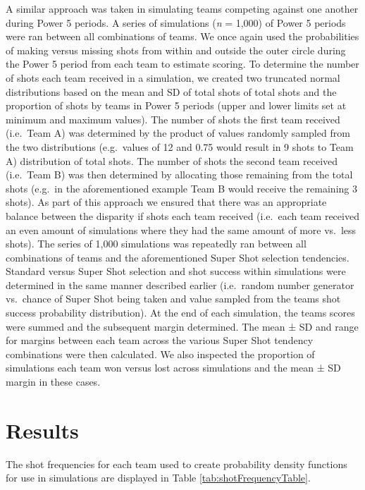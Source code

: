 \documentclass[]{elsarticle} %
\begin{document}
A similar approach was taken in simulating teams competing against one
another during Power 5 periods. A series of simulations (\emph{n} =
1,000) of Power 5 periods were ran between all combinations of teams. We
once again used the probabilities of making versus missing shots from
within and outside the outer circle during the Power 5 period from each
team to estimate scoring. To determine the number of shots each team
received in a simulation, we created two truncated normal distributions
based on the mean and SD of total shots of total shots and the
proportion of shots by teams in Power 5 periods (upper and lower limits
set at minimum and maximum values). The number of shots the first team
received (i.e.~Team A) was determined by the product of values randomly
sampled from the two distributions (e.g.~values of 12 and 0.75 would
result in 9 shots to Team A) distribution of total shots. The number of
shots the second team received (i.e.~Team B) was then determined by
allocating those remaining from the total shots (e.g.~in the
aforementioned example Team B would receive the remaining 3 shots). As
part of this approach we ensured that there was an appropriate balance
between the disparity if shots each team received (i.e.~each team
received an even amount of simulations where they had the same amount of
more vs.~less shots). The series of 1,000 simulations was repeatedly ran
between all combinations of teams and the aforementioned Super Shot
selection tendencies. Standard versus Super Shot selection and shot
success within simulations were determined in the same manner described
earlier (i.e.~random number generator vs.~chance of Super Shot being
taken and value sampled from the teams shot success probability
distribution). At the end of each simulation, the teams scores were
summed and the subsequent margin determined. The mean ± SD and range for
margins between each team across the various Super Shot tendency
combinations were then calculated. We also inspected the proportion of
simulations each team won versus lost across simulations and the mean ±
SD margin in these cases.

\hypertarget{results}{%
\section{Results}\label{results}}

The shot frequencies for each team used to create probability density
functions for use in simulations are displayed in Table
\ref{tab:shotFrequencyTable}.
\end{document}

